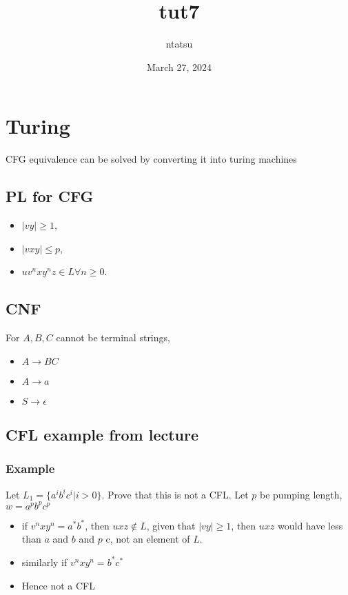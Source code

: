 \documentclass{article}
\title{tut7}
\author{ntatsu}
\date{March 27, 2024}
\theoremstyle{definition}
\theoremstyle{remark}
\begin{document}
\maketitle

\section{Turing}


CFG equivalence can be solved by converting it into turing machines

\subsection{PL for CFG}
\begin{itemize}
    \item $|vy| \geq 1$,
    \item $|vxy| \leq p$,
    \item $uv^nxy^nz \in L \forall n \geq 0$.
\end{itemize}

\subsection{CNF}
For $A, B, C$ cannot be terminal strings,
\begin{itemize}
    \item $A \rightarrow BC$
    \item $A \rightarrow a$
    \item $S \rightarrow \epsilon$
\end{itemize}

\subsection{CFL example from lecture}
\subsubsection*{Example}
Let $L_1 = \{a^ib^ic^i | i > 0\}$. Prove that this is not a CFL. Let $p$ be pumping length, $w = a^pb^pc^p$
\begin{itemize}
    \item if $v^nxy^n = a^*b^*$, then $uxz \notin L$, given that $|vy| \geq 1$, then $uxz$ would have less than $a$ and $b$ and $p$ c, not an element of $L$.
    \item similarly if $v^nxy^n = b^*c^*$
    \item Hence not a CFL
\end{itemize}
\end{document}
